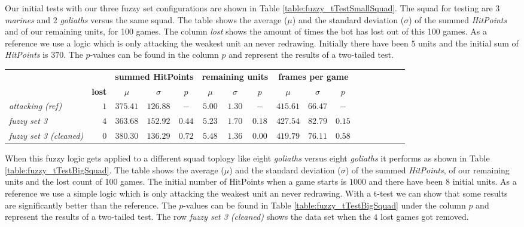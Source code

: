 %
Our initial tests with our three fuzzy set configurations are shown in Table \ref{table:fuzzy_tTestSmallSquad}. The squad for testing are 3 {\it marines} and 2 {\it goliaths} versus the same squad.
The table shows the average ($\mu$) and the standard deviation ($\sigma$) of the summed {\it HitPoints} and of our remaining units, for 100 games. The column \emph{lost} shows the amount of times the bot has lost out of this 100 games. As a reference we use a logic which is only attacking the weakest unit an never redrawing.
Initially there have been $5$ units and the initial sum of {\it HitPoints} is $370$.  The $p$-values can be found in the column $p$ and represent the results of a two-tailed test. 
%
\begin{table*}[htbp]
\caption{Fuzzy Logic: 8 Goliaths Vs. 8 Goliaths}
\begin{center}
\begin{tabular}{|l|r|c|c|c|c|c|c|c|c|c|c|ccccc}
\hline
	&  & \multicolumn{3}{|c|}{\bf summed HitPoints} 	& \multicolumn{3}{|c|}{\bf remaining units}  &  \multicolumn{3}{|c|}{\bf frames per game}  \\
	& \multicolumn{1}{|c|}{\bf lost} & $\mu$ & $\sigma$ & $p$ & 		$\mu$ & $\sigma$ & $p$  & 	$\mu$ & $\sigma$ & $p$\\
\hline
{\it attacking (ref)}	&$ 1 $&$ 375.41 $&$   	126.88 $&$ - $&$			5.00 $&$   1.30 $&$ - $&$	 	415.61 $&$ 66.47  $&$ - $\\
\emph{ fuzzy set 3 }		&$ 4 $&$ 363.68 $&$    	152.92$&$ 0.44 $&$     		5.23 $&$   1.70 $&$ 0.18 $&$ 	427.54 $&$ 82.79 $&$ 0.15 $\\
\emph{ fuzzy set 3 (cleaned)} 	&$ 0 $&$ 380.30 $&$ 	136.29$&$ 0.72 $&$ 		5.48 $&$   1.36 $&$ 0.00  $&$ 	419.79 $&$ 76.11 $&$ 0.58 $\\
\hline
\end{tabular}  
\label{table:fuzzy_tTestBigSquad}
\end{center}
\end{table*}
%
When this fuzzy logic gets applied to a different squad toplogy like eight {\it goliaths} versus eight {\it goliaths} it performs as shown in Table \ref{table:fuzzy_tTestBigSquad}. The table shows the average ($\mu$) and the standard deviation ($\sigma$) of the summed {\it HitPoints}, of our remaining units and the lost count of 100 games. The initial number of HitPoints when a game starts is $1000$ and there have been $8$ initial units. As a reference we use a simple logic which is only attacking the weakest unit an never redrawing. With a t-test we can show that some results are significantly better than the reference. The $p$-values can be found in Table \ref{table:fuzzy_tTestBigSquad} under the column $p$ and represent the results of a two-tailed test. 
The row {\it fuzzy set 3 (cleaned)} shows the data set when the $4$ lost games got removed.

